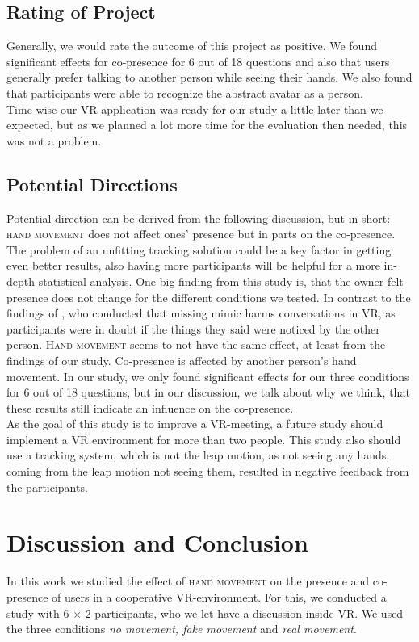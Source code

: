 \documentclass[english,runningheads,a4paper]{llncs}[2018/03/10]
\begin{document}
\subsection{Rating of Project}
Generally, we would rate the outcome of this project as positive. 
We found significant effects for co-presence for 6 out of 18 questions and also that users generally prefer talking to another person while seeing their hands.
We also found that participants were able to recognize the abstract avatar as a person. \\ \linebreak
Time-wise our VR application was ready for our study a little later than we expected, but as we planned a lot more time for the evaluation then needed, this was not a problem.

\subsection{Potential Directions}
Potential direction can be derived from the following discussion, but in short: \textsc{hand movement} does not affect ones' presence but in parts on the co-presence.
The problem of an unfitting tracking solution could be a key factor in getting even better results, also having more participants will be helpful for a more in-depth statistical analysis.
One big finding from this study is, that the owner felt presence does not change for the different conditions we tested. 
In contrast to the findings of \citet{staahl1999meetings}, who conducted that missing mimic harms conversations in VR, as participants were in doubt if the things they said were noticed by the other person.
\textsc{Hand movement} seems to not have the same effect, at least from the findings of our study.
Co-presence is affected by another person's hand movement.
In our study, we only found significant effects for our three conditions for 6 out of 18 questions, but in our discussion, we talk about why we think, that these results still indicate an influence on the co-presence. \\ \linebreak
As the goal of this study is to improve a VR-meeting, a future study should implement a VR environment for more than two people.
This study also should use a tracking system, which is not the leap motion, as not seeing any hands, coming from the leap motion not seeing them, resulted in negative feedback from the participants. 

\section{Discussion and Conclusion} \label{sec:discussion}
In this work we studied the effect of \textsc{hand movement} on the presence and co-presence of users in a cooperative VR-environment.
For this, we conducted a study with 6 $\times$ 2 participants, who we let have a discussion inside VR.
We used the three conditions \textit{no movement, fake movement} and \textit{real movement}.
\end{document}
